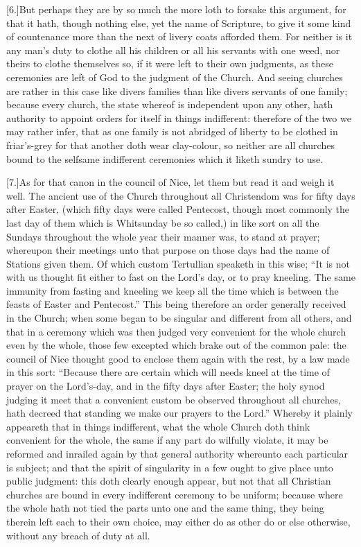 [6.]But perhaps they are by so much the more loth to forsake this argument, for that it hath, though nothing else, yet the name of Scripture, to give it some kind of countenance more than the next of livery coats afforded them. For neither is it any man’s duty to clothe all his children or all his servants with one weed, nor theirs to clothe themselves so, if it were left to their own judgments, as these ceremonies are left of God to the judgment of the Church. And seeing churches are rather in this case like divers families than like divers servants of one family; because every church, the state whereof is independent upon any other, hath authority to appoint orders for itself in things indifferent: therefore of the two we may rather infer, that as one family is not abridged of liberty to be clothed in friar’s-grey for that another doth wear clay-colour, so neither are all churches bound to the selfsame indifferent ceremonies which it liketh sundry to use.

[7.]As for that canon in the council of Nice, let them but  read it and weigh it well. The ancient use of the Church throughout all Christendom was for fifty days after Easter, (which fifty days were called Pentecost, though most commonly the last day of them which is Whitsunday be so called,) in like sort on all the Sundays throughout the whole year their manner was, to stand at prayer; whereupon their meetings unto that purpose on those days had the name of Stations given them. Of which custom Tertullian speaketh in this wise; “It is not with us thought fit either to fast on the Lord’s day, or to pray kneeling. The same immunity from fasting and kneeling we keep all the time which is between the feasts of Easter and Pentecost.” This being therefore an order generally received in the Church; when some began to be singular and different from all others, and that in a ceremony which was then judged very convenient for the whole church even by the whole, those few excepted which brake out of the common pale: the council of Nice thought good to enclose them again with the rest, by a law made in this sort: “Because there are certain which will needs kneel at the time of prayer on the Lord’s-day, and in the fifty days after Easter; the holy synod judging it meet that a convenient custom be observed throughout all churches, hath decreed that standing we make our prayers to the Lord.” Whereby it plainly appeareth that in things indifferent, what the whole Church doth think convenient for the whole, the same if any part do wilfully violate, it may be reformed and inrailed again by that general authority whereunto each particular is subject; and that the spirit of singularity in a few ought to give place unto public judgment: this doth clearly enough appear, but not that all Christian churches are bound in every indifferent ceremony to be uniform; because where the whole hath not tied the parts unto one and the same thing, they being therein left  each to their own choice, may either do as other do or else otherwise, without any breach of duty at all.

